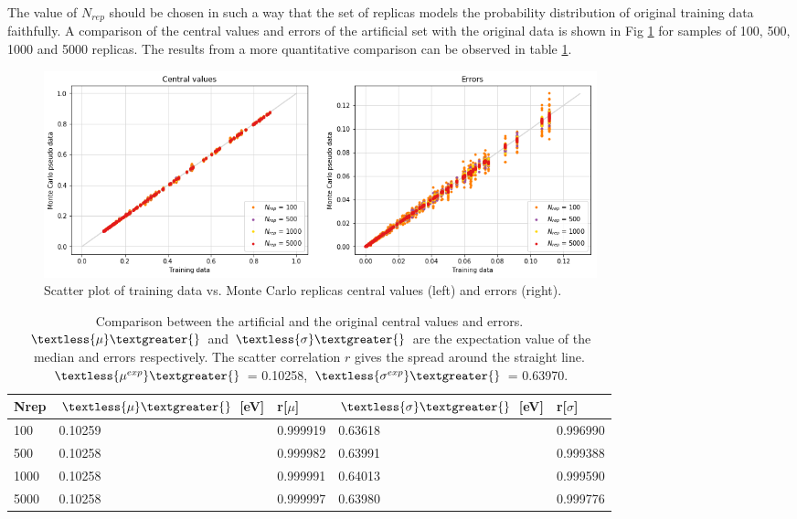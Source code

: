 \documentclass[11pt,a4paper]{article}
\numberwithin{equation}{section}
\numberwithin{figure}{section}
\numberwithin{table}{section}
\begin{document}
The value of $N_{rep}$ should be chosen in such a way that the set of replicas models the probability distribution of original training data faithfully. A comparison of the central values and errors of the artificial set with the original data is shown in Fig \ref{mcvacuum} for samples of 100, 500, 1000 and 5000 replicas. The results from a more quantitative comparison can be observed in table \ref{tablemcvacuum}.

\begin{figure}[H]
    \centering 
    \includegraphics[width=160mm]{plots/Montecarlovacuum.png}
    \caption{Scatter plot of training data vs. Monte Carlo replicas central values (left) and errors (right). }
    \label{mcvacuum}
\end{figure}
\begin{table}[H]
\centering
\begin{tabular}{|l|ll|ll|}
\hline
Nrep & $\textless{\mu}\textgreater{}$ {[}eV{]} & r{[}$\mu${]} & $\textless{\sigma}\textgreater{}$ {[}eV{]} & r{[}$\sigma${]} \\ \hline
100  & 0.10259                           & 0.999919   & 0.63618                                  & 0.996990      \\ \hline
500  & 0.10258                              & 0.999982   & 0.63991                                  & 0.999388      \\ \hline
1000 & 0.10258                              & 0.999991   & 0.64013                                  & 0.999590      \\ \hline
5000 & 0.10258                              & 0.999997   & 0.63980                                  & 0.999776      \\ \hline
\end{tabular}
\caption{Comparison between the artificial and the original central values and errors. $\textless{\mu}\textgreater{}$ and $\textless{\sigma}\textgreater{}$ are the expectation value of the median and errors respectively. The scatter correlation $r$ gives the spread around the straight line. $\textless{\mu^{exp}}\textgreater{}$ = 0.10258, $\textless{\sigma^{exp}}\textgreater{}$ = 0.63970. }
\label{tablemcvacuum}
\end{table}
\end{document}
